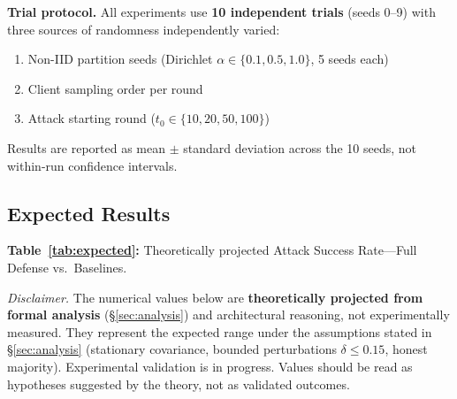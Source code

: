 \documentclass[10pt,journal]{IEEEtran}
\begin{document}
\textbf{Trial protocol.} All experiments use \textbf{10 independent trials} (seeds 0--9) with three sources of randomness independently varied:
\begin{enumerate}
  \item Non-IID partition seeds (Dirichlet $\alpha \in \{0.1, 0.5, 1.0\}$, 5 seeds each)
  \item Client sampling order per round
  \item Attack starting round ($t_0 \in \{10, 20, 50, 100\}$)
\end{enumerate}
Results are reported as mean $\pm$ standard deviation across the 10 seeds, not within-run confidence intervals.

\subsection{Expected Results}\label{sec:expected}

\textbf{Table~\ref{tab:expected}:} Theoretically projected Attack Success Rate---Full Defense vs.~Baselines.

\textit{Disclaimer.} The numerical values below are \textbf{theoretically projected from formal analysis} (\S\ref{sec:analysis}) and architectural reasoning, not experimentally measured. They represent the expected range under the assumptions stated in \S\ref{sec:analysis} (stationary covariance, bounded perturbations $\delta \le 0.15$, honest majority). Experimental validation is in progress. Values should be read as hypotheses suggested by the theory, not as validated outcomes.
\end{document}
